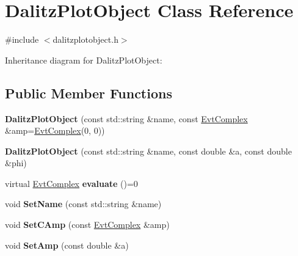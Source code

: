 \hypertarget{class_dalitz_plot_object}{}\section{Dalitz\+Plot\+Object Class Reference}
\label{class_dalitz_plot_object}


{\ttfamily \#include $<$dalitzplotobject.\+h$>$}



Inheritance diagram for Dalitz\+Plot\+Object\+:
\subsection*{Public Member Functions}
\begin{DoxyCompactItemize}
\item 
\hypertarget{class_dalitz_plot_object_a8233d3cb8cce896a8bb5c7528c220b56}{}{\bfseries Dalitz\+Plot\+Object} (const std\+::string \&name, const \hyperlink{class_evt_complex}{Evt\+Complex} \&amp=\hyperlink{class_evt_complex}{Evt\+Complex}(0, 0))\label{class_dalitz_plot_object_a8233d3cb8cce896a8bb5c7528c220b56}

\item 
\hypertarget{class_dalitz_plot_object_ac1a8b5eb26d791649aa107f421f2a881}{}{\bfseries Dalitz\+Plot\+Object} (const std\+::string \&name, const double \&a, const double \&phi)\label{class_dalitz_plot_object_ac1a8b5eb26d791649aa107f421f2a881}

\item 
\hypertarget{class_dalitz_plot_object_a1a6884b5311859693e8b5d3752de9c4e}{}virtual \hyperlink{class_evt_complex}{Evt\+Complex} {\bfseries evaluate} ()=0\label{class_dalitz_plot_object_a1a6884b5311859693e8b5d3752de9c4e}

\item 
\hypertarget{class_dalitz_plot_object_a1e9339d3aef088bbb8c9ed1e34352138}{}void {\bfseries Set\+Name} (const std\+::string \&name)\label{class_dalitz_plot_object_a1e9339d3aef088bbb8c9ed1e34352138}

\item 
\hypertarget{class_dalitz_plot_object_a6647434c73159a060c626351cfd97e7a}{}void {\bfseries Set\+C\+Amp} (const \hyperlink{class_evt_complex}{Evt\+Complex} \&amp)\label{class_dalitz_plot_object_a6647434c73159a060c626351cfd97e7a}

\item 
\hypertarget{class_dalitz_plot_object_abececb567949903f8d4b28405d38c1a9}{}void {\bfseries Set\+Amp} (const double \&a)\label{class_dalitz_plot_object_abececb567949903f8d4b28405d38c1a9}


\end{DoxyCompactItemize}
